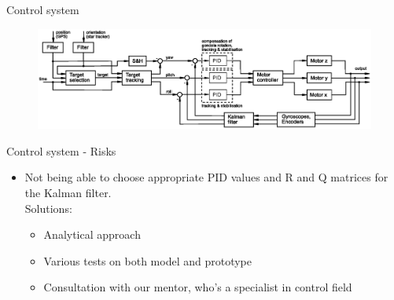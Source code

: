 \documentclass[11pt, aspectratio=169]{beamer}
\begin{document}
\begin{frame}[c]{Control system}
    \begin{figure}
        \includegraphics[width=\linewidth]{figures/images/Control_loop_v2.eps}
    \end{figure}
\end{frame}

\begin{frame}[c]{Control system - Risks}
    \begin{itemize}
        \item Not being able to choose appropriate PID values and R and Q matrices for the Kalman filter.\\
         Solutions: 
        \begin{itemize}
            \item Analytical approach
            \item Various tests on both model and prototype
            \item Consultation with our mentor, who's a specialist in control field
        \end{itemize}
    \end{itemize}
\end{frame}
\end{document}

